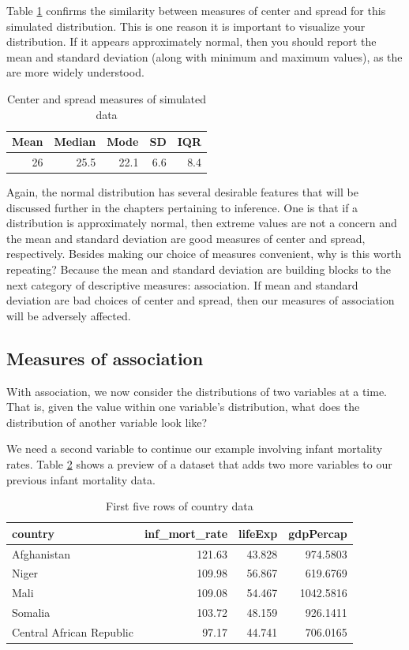 \documentclass[
]{book}
\begin{document}
Table \ref{tab:normratesum} confirms the similarity between measures of center and spread for this simulated distribution. This is one reason it is important to visualize your distribution. If it appears approximately normal, then you should report the mean and standard deviation (along with minimum and maximum values), as the are more widely understood.

\begin{table}

\caption{\label{tab:normratesum}Center and spread measures of simulated data}
\centering
\begin{tabular}[t]{r|r|r|r|r}
\hline
Mean & Median & Mode & SD & IQR\\
\hline
26 & 25.5 & 22.1 & 6.6 & 8.4\\
\hline
\end{tabular}
\end{table}

Again, the normal distribution has several desirable features that will be discussed further in the chapters pertaining to inference. One is that if a distribution is approximately normal, then extreme values are not a concern and the mean and standard deviation are good measures of center and spread, respectively. Besides making our choice of measures convenient, why is this worth repeating? Because the mean and standard deviation are building blocks to the next category of descriptive measures: association. If mean and standard deviation are bad choices of center and spread, then our measures of association will be adversely affected.

\hypertarget{measures-of-association}{%
\subsection{Measures of association}\label{measures-of-association}}

With association, we now consider the distributions of two variables at a time. That is, given the value within one variable's distribution, what does the distribution of another variable look like?

We need a second variable to continue our example involving infant mortality rates. Table \ref{tab:gapdeathtab} shows a preview of a dataset that adds two more variables to our previous infant mortality data.

\begin{table}

\caption{\label{tab:gapdeathtab}First five rows of country data}
\centering
\begin{tabular}[t]{l|r|r|r}
\hline
country & inf\_mort\_rate & lifeExp & gdpPercap\\
\hline
Afghanistan & 121.63 & 43.828 & 974.5803\\
\hline
Niger & 109.98 & 56.867 & 619.6769\\
\hline
Mali & 109.08 & 54.467 & 1042.5816\\
\hline
Somalia & 103.72 & 48.159 & 926.1411\\
\hline
Central African Republic & 97.17 & 44.741 & 706.0165\\
\hline
\end{tabular}
\end{table}
\end{document}

